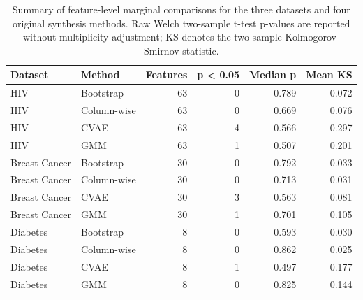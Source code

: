 \begin{table}
\caption{Summary of feature-level marginal comparisons for the three datasets and four original synthesis methods. Raw Welch two-sample t-test p-values are reported without multiplicity adjustment; KS denotes the two-sample Kolmogorov-Smirnov statistic.}
\label{tab:marginal_summary}
\begin{tabular}{llrrrr}
\toprule
Dataset & Method & Features & p < 0.05 & Median p & Mean KS \\
\midrule
HIV & Bootstrap & 63 & 0 & 0.789 & 0.072 \\
HIV & Column-wise & 63 & 0 & 0.669 & 0.076 \\
HIV & CVAE & 63 & 4 & 0.566 & 0.297 \\
HIV & GMM & 63 & 1 & 0.507 & 0.201 \\
Breast Cancer & Bootstrap & 30 & 0 & 0.792 & 0.033 \\
Breast Cancer & Column-wise & 30 & 0 & 0.713 & 0.031 \\
Breast Cancer & CVAE & 30 & 3 & 0.563 & 0.081 \\
Breast Cancer & GMM & 30 & 1 & 0.701 & 0.105 \\
Diabetes & Bootstrap & 8 & 0 & 0.593 & 0.030 \\
Diabetes & Column-wise & 8 & 0 & 0.862 & 0.025 \\
Diabetes & CVAE & 8 & 1 & 0.497 & 0.177 \\
Diabetes & GMM & 8 & 0 & 0.825 & 0.144 \\
\bottomrule
\end{tabular}
\end{table}
